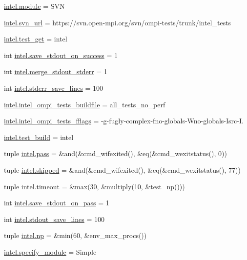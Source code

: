 \begin{DoxyCompactItemize}
\item 
\hyperlink{namespaceintel_a69d4dd86ec6bbe47c3b61b1f6ff2ee90}{intel.\-module} = S\-V\-N
\item 
\hyperlink{namespaceintel_a8d07e9dc296f8c50b9c97df6aaeb9093}{intel.\-svn\-\_\-url} = https\-://svn.\-open-\/mpi.\-org/svn/ompi-\/tests/trunk/intel\-\_\-tests
\item 
\hyperlink{namespaceintel_a63ac10a6acb63df6cfdeeb2bfebcdf53}{intel.\-test\-\_\-get} = intel
\item 
int \hyperlink{namespaceintel_aae23293ca49af13cfb800e28cb67a86b}{intel.\-save\-\_\-stdout\-\_\-on\-\_\-success} = 1
\item 
int \hyperlink{namespaceintel_abcdeb2ca543c96841368e04128f5f60a}{intel.\-merge\-\_\-stdout\-\_\-stderr} = 1
\item 
int \hyperlink{namespaceintel_a1d6c46c17a246ddee37c7ee9113b90c4}{intel.\-stderr\-\_\-save\-\_\-lines} = 100
\item 
\hyperlink{namespaceintel_a6d37e743ba16cdc0edc8c8a459e81ef1}{intel.\-intel\-\_\-ompi\-\_\-tests\-\_\-buildfile} = all\-\_\-tests\-\_\-no\-\_\-perf
\item 
\hyperlink{namespaceintel_a2519f22774a6f062a8d9c1a0ca33f855}{intel.\-intel\-\_\-ompi\-\_\-tests\-\_\-fflags} = -\/g-\/fugly-\/complex-\/fno-\/globals-\/Wno-\/globals-\/Isrc-\/I.
\item 
\hyperlink{namespaceintel_ae8bf5f8888540acb407bf95e166dcfc6}{intel.\-test\-\_\-build} = intel
\item 
tuple \hyperlink{namespaceintel_abe7eb5e3e0f0e655ca871399725225ec}{intel.\-pass} = \&and(\&cmd\-\_\-wifexited(), \&eq(\&cmd\-\_\-wexitstatus(), 0))
\item 
tuple \hyperlink{namespaceintel_a0a787d49a6dd289fbd58591c9de5fbb5}{intel.\-skipped} = \&and(\&cmd\-\_\-wifexited(), \&eq(\&cmd\-\_\-wexitstatus(), 77))
\item 
tuple \hyperlink{namespaceintel_aeda6c693f850472a86267c93f7665d47}{intel.\-timeout} = \&max(30, \&multiply(10, \&test\-\_\-np()))
\item 
int \hyperlink{namespaceintel_a842390e7e793fca2c69572646d19a7c2}{intel.\-save\-\_\-stdout\-\_\-on\-\_\-pass} = 1
\item 
int \hyperlink{namespaceintel_a81a6cddb285ad15b56a91a58c0032984}{intel.\-stdout\-\_\-save\-\_\-lines} = 100
\item 
tuple \hyperlink{namespaceintel_a558dbc0148f5b13814f44a2d26dd4dd3}{intel.\-np} = \&min(60, \&env\-\_\-max\-\_\-procs())
\item 
\hyperlink{namespaceintel_a013bf13af420a4b19b5adc9846a18346}{intel.\-specify\-\_\-module} = Simple
\end{DoxyCompactItemize}
